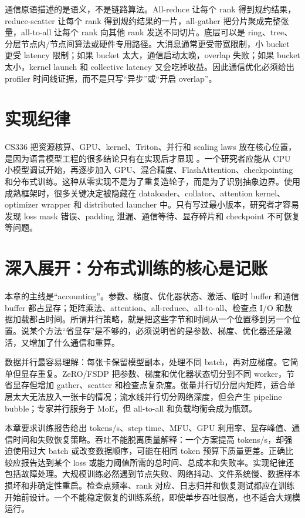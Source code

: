 \documentclass[UTF8,zihao=-4,openany]{ctexbook}
\begin{document}
通信原语描述的是语义，不是链路算法。All-reduce 让每个 rank 得到规约结果，reduce-scatter 让每个 rank 得到规约结果的一片，all-gather 把分片聚成完整张量，all-to-all 让每个 rank 向其他 rank 发送不同切片。底层可以是 ring、tree、分层节点内/节点间算法或硬件专用路径。大消息通常更受带宽限制，小 bucket 更受 latency 限制；如果 bucket 太大，通信启动太晚，overlap 失败；如果 bucket 太小，kernel launch 和 collective latency 又会吃掉收益。因此通信优化必须给出 profiler 时间线证据，而不是只写“异步”或“开启 overlap”。

\section{实现纪律}
CS336 把资源核算、GPU、kernel、Triton、并行和 scaling laws 放在核心位置，是因为语言模型工程的很多结论只有在实现后才显现 \cite{stanfordcs3362026}。一个研究者应能从 CPU 小模型调试开始，再逐步加入 GPU、混合精度、FlashAttention、checkpointing 和分布式训练。这种从零实现不是为了重复造轮子，而是为了识别抽象边界。使用成熟框架时，很多关键决定被隐藏在 dataloader、collator、attention kernel、optimizer wrapper 和 distributed launcher 中。只有写过最小版本，研究者才容易发现 loss mask 错误、padding 泄漏、通信等待、显存碎片和 checkpoint 不可恢复等问题。

\section{深入展开：分布式训练的核心是记账}
本章的主线是“accounting”。参数、梯度、优化器状态、激活、临时 buffer 和通信 buffer 都占显存；矩阵乘法、attention、all-reduce、all-to-all、检查点 I/O 和数据加载都占时间。所谓并行策略，就是把这些字节和时间从一个位置移到另一个位置。说某个方法“省显存”是不够的，必须说明省的是参数、梯度、优化器还是激活，又增加了什么通信和重算。

数据并行最容易理解：每张卡保留模型副本，处理不同 batch，再对应梯度。它简单但显存重复。ZeRO/FSDP 把参数、梯度和优化器状态切分到不同 worker，节省显存但增加 gather、scatter 和检查点复杂度。张量并行切分层内矩阵，适合单层太大无法放入一张卡的情况；流水线并行切分网络深度，但会产生 pipeline bubble；专家并行服务于 MoE，但 all-to-all 和负载均衡会成为瓶颈。

本章要求训练报告给出 tokens/s、step time、MFU、GPU 利用率、显存峰值、通信时间和失败恢复策略。吞吐不能脱离质量解释：一个方案提高 tokens/s，却强迫使用过大 batch 或改变数据顺序，可能在相同 token 预算下质量更差。正确比较应报告达到某个 loss 或能力阈值所需的总时间、总成本和失败率。实现纪律还包括故障处理。大规模训练必然遇到节点失败、网络抖动、文件系统慢、数据样本损坏和非确定性重启。检查点频率、rank 对应、日志归并和恢复测试都应在训练开始前设计。一个不能稳定恢复的训练系统，即使单步吞吐很高，也不适合大规模运行。
\end{document}
